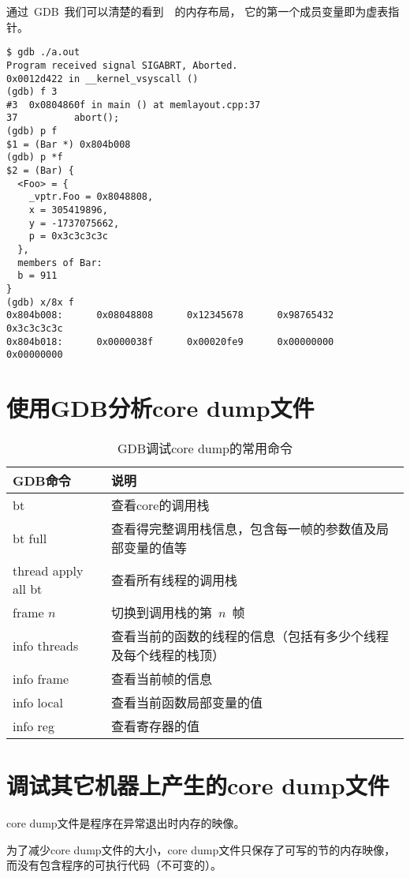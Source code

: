通过~GDB~我们可以清楚的看到~~的内存布局，
它的第一个成员变量即为虚表指针。

\begin{lstlisting}
$ gdb ./a.out
Program received signal SIGABRT, Aborted.
0x0012d422 in __kernel_vsyscall ()
(gdb) f 3
#3  0x0804860f in main () at memlayout.cpp:37
37          abort();
(gdb) p f
$1 = (Bar *) 0x804b008
(gdb) p *f
$2 = (Bar) {
  <Foo> = {
    _vptr.Foo = 0x8048808,
    x = 305419896,
    y = -1737075662,
    p = 0x3c3c3c3c
  },
  members of Bar:
  b = 911
}
(gdb) x/8x f
0x804b008:      0x08048808      0x12345678      0x98765432      0x3c3c3c3c
0x804b018:      0x0000038f      0x00020fe9      0x00000000      0x00000000
\end{lstlisting}

\section{使用GDB分析core dump文件}

\begin{table}
\begin{tabularx}{400pt}{l|X}
\hline
GDB命令 & 说明 \\
\hline
bt                  &   查看core的调用栈    \\
bt full		        &   查看得完整调用栈信息，包含每一帧的参数值及局部变量的值等 \\
thread apply all bt &   查看所有线程的调用栈 \\
frame $n$           &   切换到调用栈的第~$n$~帧 \\
info threads	    &   查看当前的函数的线程的信息（包括有多少个线程及每个线程的栈顶） \\
info frame 	        &   查看当前帧的信息 \\
info local          &   查看当前函数局部变量的值 \\
info reg		    &   查看寄存器的值 \\
\hline
\end{tabularx}
\caption{GDB调试core dump的常用命令}
\end{table}


\section{调试其它机器上产生的core dump文件}

core dump文件是程序在异常退出时内存的映像。

为了减少core dump文件的大小，core dump文件只保存了可写的节的内存映像，
而没有包含程序的可执行代码（不可变的）。


